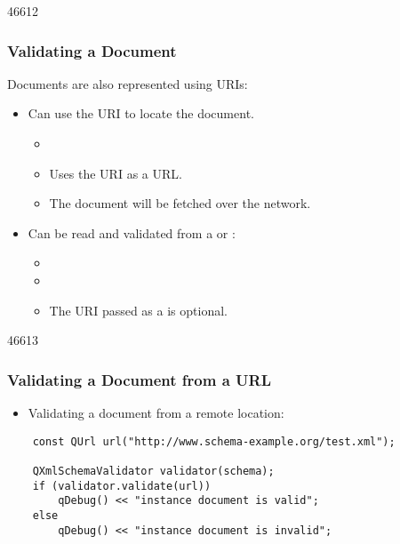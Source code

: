 \begin{slide}{46612}
\frametitle{Validating a Document}

Documents are also represented using URIs:

\begin{itemize}
\item Can use the URI  to locate the document.
  \begin{itemize}
  \item {}
  \item Uses the URI as a URL.
  \item The document will be fetched over the network.
  \end{itemize}
\item Can be read and validated from a  or :
  \begin{itemize}
  \item {}
  \item {}
  \item The URI passed as a  is optional.
  \end{itemize}
\end{itemize}

\end{slide}

\begin{slide}[fragile]{46613}
\frametitle{Validating a Document from a URL}

\begin{itemize}
\item Validating a document from a remote location:
\end{itemize}

\begin{lstlisting}
    const QUrl url("http://www.schema-example.org/test.xml");

    QXmlSchemaValidator validator(schema);
    if (validator.validate(url))
        qDebug() << "instance document is valid";
    else
        qDebug() << "instance document is invalid";
\end{lstlisting}

\end{slide}

